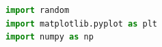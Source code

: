 \begin{lstlisting}[language=Python]
import random
import matplotlib.pyplot as plt
import numpy as np
\end{lstlisting}
